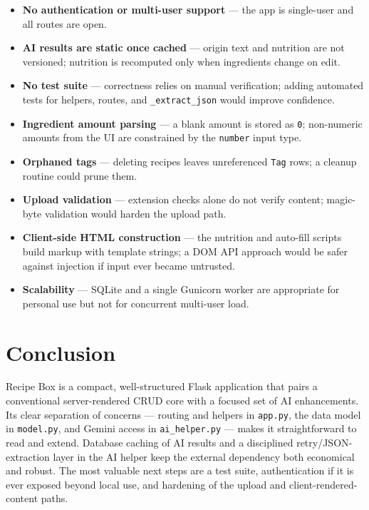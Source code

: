 \documentclass[11pt,a4paper]{article}
\newcommand{\code}[1]{\texttt{#1}}
\begin{document}
\begin{itemize}
  \item \textbf{No authentication or multi-user support} --- the app is
        single-user and all routes are open.
  \item \textbf{AI results are static once cached} --- origin text and nutrition
        are not versioned; nutrition is recomputed only when ingredients change
        on edit.
  \item \textbf{No test suite} --- correctness relies on manual verification;
        adding automated tests for helpers, routes, and \code{\_extract\_json}
        would improve confidence.
  \item \textbf{Ingredient amount parsing} --- a blank amount is stored as
        \code{0}; non-numeric amounts from the UI are constrained by the
        \code{number} input type.
  \item \textbf{Orphaned tags} --- deleting recipes leaves unreferenced
        \code{Tag} rows; a cleanup routine could prune them.
  \item \textbf{Upload validation} --- extension checks alone do not verify
        content; magic-byte validation would harden the upload path.
  \item \textbf{Client-side HTML construction} --- the nutrition and auto-fill
        scripts build markup with template strings; a DOM API approach would be
        safer against injection if input ever became untrusted.
  \item \textbf{Scalability} --- SQLite and a single Gunicorn worker are
        appropriate for personal use but not for concurrent multi-user load.
\end{itemize}

\section{Conclusion}

Recipe Box is a compact, well-structured Flask application that pairs a
conventional server-rendered CRUD core with a focused set of AI enhancements.
Its clear separation of concerns --- routing and helpers in \code{app.py}, the
data model in \code{model.py}, and Gemini access in \code{ai\_helper.py} ---
makes it straightforward to read and extend. Database caching of AI results and
a disciplined retry/JSON-extraction layer in the AI helper keep the external
dependency both economical and robust. The most valuable next steps are a test
suite, authentication if it is ever exposed beyond local use, and hardening of
the upload and client-rendered-content paths.
\end{document}
